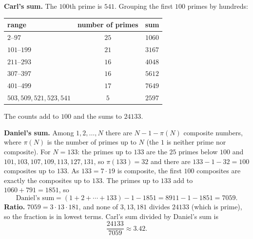 \textbf{Carl's sum.} The $100$th prime is $541$. Grouping the first $100$ primes by hundreds:
\begin{center}
\begin{tabular}{lcc}
range & number of primes & sum\\ \hline
$2$--$97$ & $25$ & $1060$\\
$101$--$199$ & $21$ & $3167$\\
$211$--$293$ & $16$ & $4048$\\
$307$--$397$ & $16$ & $5612$\\
$401$--$499$ & $17$ & $7649$\\
$503,509,521,523,541$ & $5$ & $2597$
\end{tabular}
\end{center}
The counts add to $100$ and the sums to $24133$.

\textbf{Daniel's sum.} Among $1,2,\dots,N$ there are $N-1-\pi(N)$ composite numbers, where $\pi(N)$ is the number of primes up to $N$ (the $1$ is neither prime nor composite). For $N=133$: the primes up to $133$ are the $25$ primes below $100$ and $101,103,107,109,113,127,131$, so $\pi(133)=32$ and there are $133-1-32=100$ composites up to $133$. As $133=7\cdot19$ is composite, the first $100$ composites are exactly the composites up to $133$. The primes up to $133$ add to $1060+791=1851$, so
\[
\text{Daniel's sum}=(1+2+\cdots+133)-1-1851=8911-1-1851=7059 .
\]
\textbf{Ratio.} $7059=3\cdot13\cdot181$, and none of $3,13,181$ divides $24133$ (which is prime), so the fraction is in lowest terms. Carl's sum divided by Daniel's sum is
\[
\boxed{\dfrac{24133}{7059}}\approx3.42 .
\]
